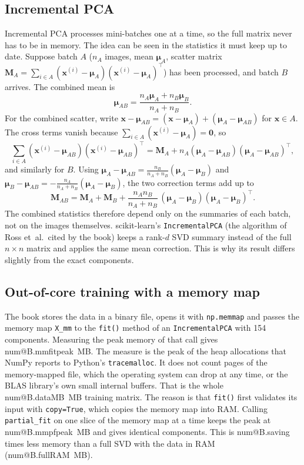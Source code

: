 \documentclass[11pt,a4paper]{article}
\makeatletter
\newcommand{\R}[1]{\csname num@#1\endcsname}
\newcommand{\x}{\mathbf{x}}
\newcommand{\bmu}{\boldsymbol{\mu}}
\newcommand{\T}{^{\top}}
\makeatother
\begin{document}
\subsection{Incremental PCA}

Incremental PCA processes mini-batches one at a time, so the full matrix never has to be in memory. The idea can be seen in the statistics it must keep up to date. Suppose batch $A$ ($n_A$ images, mean $\bmu_A$, scatter matrix $\mathbf{M}_A=\sum_{i\in A}(\x^{(i)}-\bmu_A)(\x^{(i)}-\bmu_A)\T$) has been processed, and batch $B$ arrives. The combined mean is
\begin{equation}
\bmu_{AB}=\frac{n_A\bmu_A+n_B\bmu_B}{n_A+n_B}.
\end{equation}
For the combined scatter, write $\x-\bmu_{AB}=(\x-\bmu_A)+(\bmu_A-\bmu_{AB})$ for $\x\in A$. The cross terms vanish because $\sum_{i\in A}(\x^{(i)}-\bmu_A)=\mathbf{0}$, so
\begin{equation}
\sum_{i\in A}(\x^{(i)}-\bmu_{AB})(\x^{(i)}-\bmu_{AB})\T=\mathbf{M}_A+n_A(\bmu_A-\bmu_{AB})(\bmu_A-\bmu_{AB})\T ,
\end{equation}
and similarly for $B$. Using $\bmu_A-\bmu_{AB}=\frac{n_B}{n_A+n_B}(\bmu_A-\bmu_B)$ and $\bmu_B-\bmu_{AB}=-\frac{n_A}{n_A+n_B}(\bmu_A-\bmu_B)$, the two correction terms add up to
\begin{equation}
\mathbf{M}_{AB}=\mathbf{M}_A+\mathbf{M}_B+\frac{n_A n_B}{n_A+n_B}\,(\bmu_A-\bmu_B)(\bmu_A-\bmu_B)\T .
\end{equation}
The combined statistics therefore depend only on the summaries of each batch, not on the images themselves. scikit-learn's \texttt{IncrementalPCA} (the algorithm of Ross et~al.\ cited by the book) keeps a rank-$d$ SVD summary instead of the full $n\times n$ matrix and applies the same mean correction. This is why its result differs slightly from the exact components.

\subsection{Out-of-core training with a memory map}

The book stores the data in a binary file, opens it with \texttt{np.memmap} and passes the memory map \texttt{X\_mm} to the \texttt{fit()} method of an \texttt{IncrementalPCA} with 154 components. Measuring the peak memory of that call gives \R{B.mmfitpeak}~MB. The measure is the peak of the heap allocations that NumPy reports to Python's \texttt{tracemalloc}. It does not count pages of the memory-mapped file, which the operating system can drop at any time, or the BLAS library's own small internal buffers. That is the whole \R{B.dataMB}~MB training matrix. The reason is that \texttt{fit()} first validates its input with \texttt{copy=True}, which copies the memory map into RAM. Calling \texttt{partial\_fit} on one slice of the memory map at a time keeps the peak at \R{B.mmpfpeak}~MB and gives identical components. This is \R{B.saving} times less memory than a full SVD with the data in RAM (\R{B.fullRAM}~MB).
\end{document}
